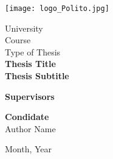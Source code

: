 \begin{titlepage}
    \begin{center}
        \vspace{1cm}
        
        \texttt{[image: logo\_Polito.jpg]}
        
        \vspace{0.8cm}
        \huge
        University\\
        \LARGE
        \vspace{0.3cm}
        Course\\
        \vspace{2cm}
        Type of Thesis\\
        \vspace{0.8cm}
        \Huge
        \textbf{Thesis Title}\\
        \Large 
        \vspace{0.5cm}
                \textbf{Thesis Subtitle}\\
        
        \vspace{2.5cm}
        \large
        \begin{flushleft}
        \textbf{Supervisors}\\
        \vspace{0.2cm}

        \end{flushleft}
        \begin{flushright}
        \textbf{Condidate}\\
        \vspace{0.2cm}
        Author Name\\
        \end{flushright}
        \vspace{0.5cm}
        Month, Year
    \end{center}
\end{titlepage}